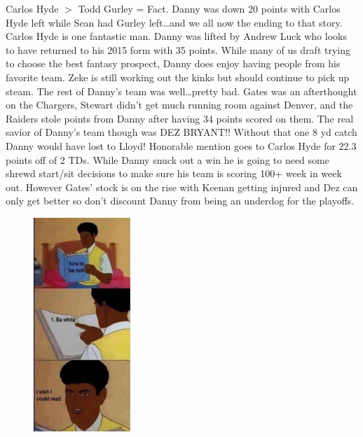 \documentclass[11pt,letterpaper]{article}
\begin{document}
\newpage
{}
\par\noindent Carlos Hyde $>$ Todd Gurley = Fact. Danny was down 20 points with Carlos Hyde left while Sean had Gurley left\dots and we all now the ending to that story. Carlos Hyde is one fantastic man. Danny was lifted by Andrew Luck who looks to have returned to his 2015 form with 35 points. While many of us draft trying to choose the best fantasy prospect, Danny does enjoy having people from his favorite team. Zeke is still working out the kinks but should continue to pick up steam. The rest of Danny's team was well\dots pretty bad. Gates was an afterthought on the Chargers, Stewart didn't get much running room against Denver, and the Raiders stole points from Danny after having 34 points scored on them. The real savior of Danny's team though was DEZ BRYANT!! Without that one 8 yd catch Danny would have lost to Lloyd! Honorable mention goes to Carlos Hyde for 22.3 points off of 2 TDs. While Danny snuck out a win he is going to need some shrewd start/sit decisions to make sure his team is scoring 100+ week in week out. However Gates’ stock is on the rise with Keenan getting injured and Dez can only get better so don't discount Danny from being an underdog for the playoffs.
\begin{figure}
\centering
\includegraphics[width=0.325\textwidth]{week1-lloyd.png}
\label{fig:week1-lloyd}
\end{figure} 
\bigskip
\end{document}
